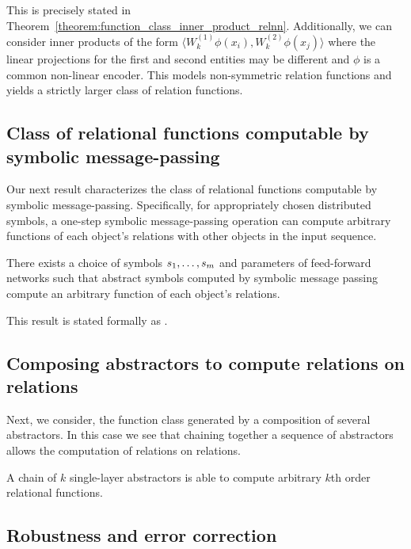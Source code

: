 This is precisely stated in Theorem~\ref{theorem:function_class_inner_product_relnn}. 
Additionally, we can consider inner products of the form
$\langle W_k^{(1)} \phi(x_i), W_k^{(2)} \phi(x_j) \rangle$
where the linear projections for the first and second entities may be different and $\phi$ is a common non-linear encoder. This models non-symmetric relation functions and yields a strictly larger class of relation functions.

\subsection{Class of relational functions computable by symbolic message-passing}

Our next result characterizes the class of relational functions computable by symbolic message-passing.
Specifically, for appropriately chosen distributed symbols, 
a one-step symbolic message-passing operation can compute arbitrary functions of each object's relations with other objects in the input sequence. 

\begin{result}
    There exists a choice of symbols \(s_1, \ldots, s _m\) and parameters of feed-forward networks such that abstract symbols computed by symbolic message passing compute an arbitrary function of each object's relations.
\end{result}

This result is stated formally as .

\subsection{Composing  abstractors to compute relations on relations}
\label{ssec:compsing_abstractors_preview}

Next, we consider, the function class generated by a composition of several abstractors. In this case we see that chaining together a sequence of  abstractors allows the computation of relations on relations.

\begin{result}
A chain of \(k\) single-layer  abstractors is able to compute arbitrary \(k\)th order relational functions.
\end{result}

\subsection{Robustness and error correction}

